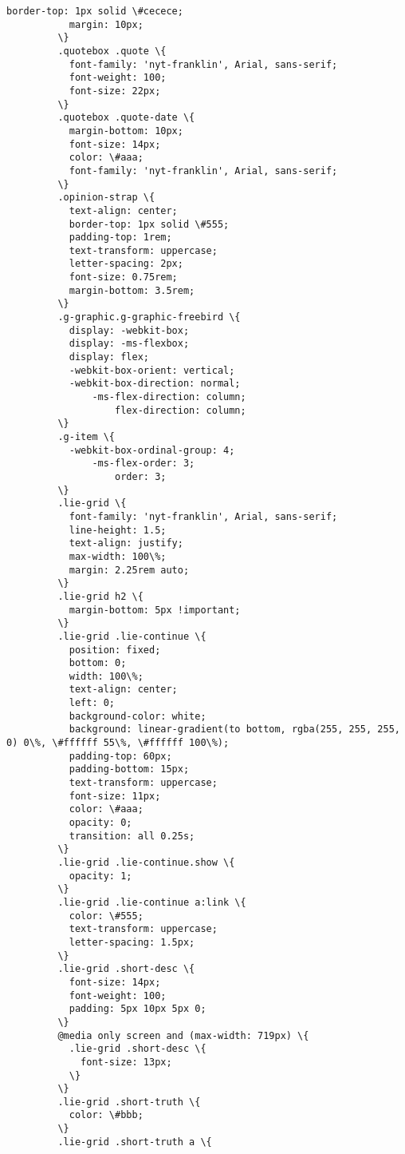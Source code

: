\documentclass[11pt]{article}
\begin{document}
\begin{Verbatim}[commandchars=\\\{\}]
           border-top: 1px solid \#cecece;
           margin: 10px;
         \}
         .quotebox .quote \{
           font-family: 'nyt-franklin', Arial, sans-serif;
           font-weight: 100;
           font-size: 22px;
         \}
         .quotebox .quote-date \{
           margin-bottom: 10px;
           font-size: 14px;
           color: \#aaa;
           font-family: 'nyt-franklin', Arial, sans-serif;
         \}
         .opinion-strap \{
           text-align: center;
           border-top: 1px solid \#555;
           padding-top: 1rem;
           text-transform: uppercase;
           letter-spacing: 2px;
           font-size: 0.75rem;
           margin-bottom: 3.5rem;
         \}
         .g-graphic.g-graphic-freebird \{
           display: -webkit-box;
           display: -ms-flexbox;
           display: flex;
           -webkit-box-orient: vertical;
           -webkit-box-direction: normal;
               -ms-flex-direction: column;
                   flex-direction: column;
         \}
         .g-item \{
           -webkit-box-ordinal-group: 4;
               -ms-flex-order: 3;
                   order: 3;
         \}
         .lie-grid \{
           font-family: 'nyt-franklin', Arial, sans-serif;
           line-height: 1.5;
           text-align: justify;
           max-width: 100\%;
           margin: 2.25rem auto;
         \}
         .lie-grid h2 \{
           margin-bottom: 5px !important;
         \}
         .lie-grid .lie-continue \{
           position: fixed;
           bottom: 0;
           width: 100\%;
           text-align: center;
           left: 0;
           background-color: white;
           background: linear-gradient(to bottom, rgba(255, 255, 255, 0) 0\%, \#ffffff 55\%, \#ffffff 100\%);
           padding-top: 60px;
           padding-bottom: 15px;
           text-transform: uppercase;
           font-size: 11px;
           color: \#aaa;
           opacity: 0;
           transition: all 0.25s;
         \}
         .lie-grid .lie-continue.show \{
           opacity: 1;
         \}
         .lie-grid .lie-continue a:link \{
           color: \#555;
           text-transform: uppercase;
           letter-spacing: 1.5px;
         \}
         .lie-grid .short-desc \{
           font-size: 14px;
           font-weight: 100;
           padding: 5px 10px 5px 0;
         \}
         @media only screen and (max-width: 719px) \{
           .lie-grid .short-desc \{
             font-size: 13px;
           \}
         \}
         .lie-grid .short-truth \{
           color: \#bbb;
         \}
         .lie-grid .short-truth a \{

\end{Verbatim}
\end{document}

